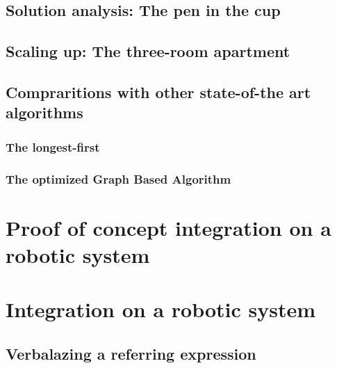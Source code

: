 \subsection{Solution analysis: The pen in the cup}

\subsection{Scaling up: The three-room apartment}

\subsection{Compraritions with other state-of-the art algorithms}

\subsubsection{The longest-first}

\subsubsection{The optimized Graph Based Algorithm}

\section{Proof of concept integration on a robotic system}

\section{Integration on a robotic system}

\subsection{Verbalazing a referring expression}

